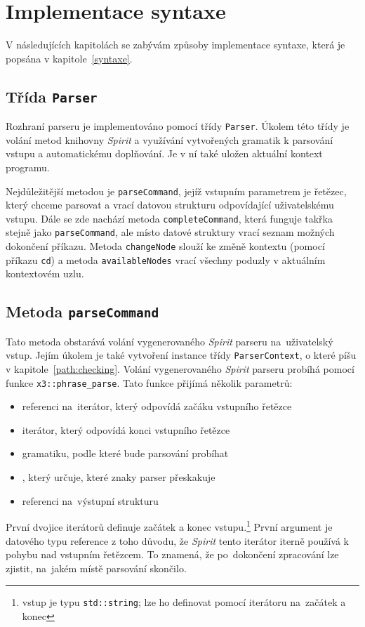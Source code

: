 \documentclass[thesis=B,czech,hidelinks]{FITthesis}[2019/03/06]
\begin{document}
\section{Implementace syntaxe}\label{syntax:impl}
V následujících kapitolách se zabývám způsoby implementace syntaxe, která je popsána v kapitole~\ref{syntaxe}.

\subsection{Třída \texttt{Parser}}
Rozhraní parseru je implementováno pomocí třídy \texttt{Parser}. Úkolem této třídy je volání metod knihovny \textit{Spirit} a využívání vytvořených gramatik k parsování vstupu a automatickému doplňování. Je v ní také uložen aktuální kontext programu.

Nejdůležitější metodou je \texttt{parseCommand}, jejíž vstupním parametrem je řetězec, který chceme parsovat a vrací datovou strukturu odpovídající uživatelskému vstupu. Dále se zde nachází metoda \texttt{completeCommand}, která funguje takřka stejně jako \texttt{parseCommand}, ale místo datové struktury vrací seznam možných dokončení příkazu. Metoda \texttt{changeNode} slouží ke změně kontextu (pomocí příkazu \texttt{cd}) a metoda \texttt{availableNodes} vrací všechny poduzly v aktuálním kontextovém uzlu.

\subsection{Metoda \texttt{parseCommand}}
Tato metoda obstarává volání vygenerovaného \textit{Spirit} parseru na~uživatelský vstup. Jejím úkolem je také vytvoření instance třídy \texttt{ParserContext}, o které píšu v kapitole~\ref{path:checking}. Volání vygenerovaného \textit{Spirit} parseru probíhá pomocí funkce \texttt{x3::phrase\_parse}. Tato funkce přijímá několik parametrů:

\begin{itemize}
    \item referenci na~iterátor, který odpovídá začáku vstupního řetězce
    \item iterátor, který odpovídá konci vstupního řetězce
    \item gramatiku, podle které bude parsování probíhat
    \item {}, který určuje, které znaky parser přeskakuje
    \item referenci na~výstupní strukturu
\end{itemize}
První dvojice iterátorů definuje začátek a konec vstupu.\footnote{vstup je typu \texttt{std::string}; lze ho definovat pomocí iterátoru na~začátek a konec} První argument je datového typu reference z toho důvodu, že \textit{Spirit} tento iterátor iterně používá k pohybu nad vstupním řetězcem. To znamená, že po~dokončení zpracování lze zjistit, na~jakém místě parsování skončilo.
\end{document}
